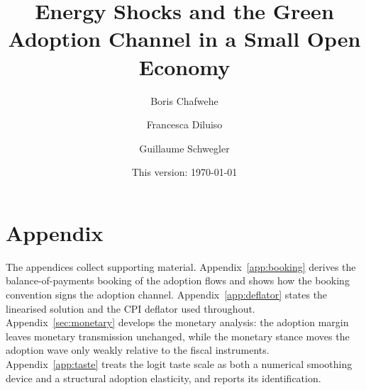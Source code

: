 \documentclass[12pt]{article}
\title{Energy Shocks and the Green Adoption Channel in a Small Open Economy}
\author{Boris Chafwehe \and Francesca Diluiso \and Guillaume Schwegler}
\date{\normalsize This version: \today}
\begin{document}











\clearpage


\clearpage
\appendix
\section*{Appendix}

\noindent The appendices collect supporting material. Appendix~\ref{app:booking}
derives the balance-of-payments booking of the adoption flows and shows how the
booking convention signs the adoption channel. Appendix~\ref{app:deflator} states
the linearised solution and the CPI deflator used throughout. Appendix~\ref{sec:monetary}
develops the monetary analysis: the adoption margin leaves monetary transmission
unchanged, while the monetary stance moves the adoption wave only weakly relative to
the fiscal instruments. Appendix~\ref{app:taste} treats the logit taste scale as both
a numerical smoothing device and a structural adoption elasticity, and reports its
identification.





\end{document}

